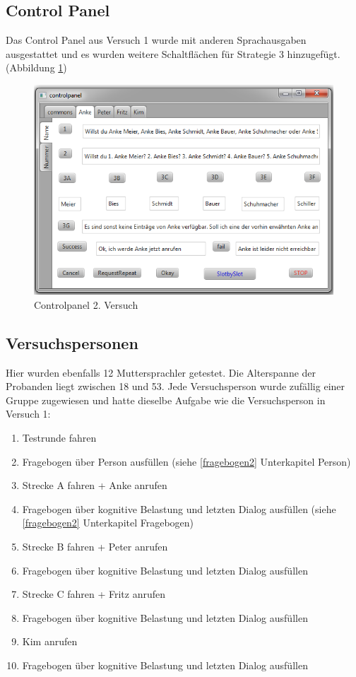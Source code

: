 \documentclass[12pt,a4paper]{scrartcl}
\begin{document}
\subsection{Control Panel}
Das Control Panel aus Versuch 1 wurde mit anderen Sprachausgaben ausgestattet und es wurden weitere Schaltflächen für Strategie 3 hinzugefügt. (Abbildung \ref{cp2})
\begin{figure}[H]
\includegraphics[width=13cm]{controlpanel2.png}
\caption{Controlpanel 2. Versuch}
\label{cp2}
\end{figure}


\subsection{Versuchspersonen}

Hier wurden ebenfalls 12 Muttersprachler getestet. Die Alterspanne der Probanden liegt zwischen 18 und 53. Jede Versuchsperson wurde zufällig einer Gruppe zugewiesen und hatte dieselbe Aufgabe wie die Versuchsperson in Versuch 1: 
\begin{enumerate}
\item Testrunde fahren
\item Fragebogen über Person ausfüllen (siehe \ref{fragebogen2} Unterkapitel Person)
\item Strecke A fahren + Anke anrufen
\item Fragebogen über kognitive Belastung und letzten Dialog ausfüllen (siehe \ref{fragebogen2} Unterkapitel Fragebogen)
\item Strecke B fahren + Peter anrufen
\item Fragebogen über kognitive Belastung und letzten Dialog ausfüllen
\item Strecke C fahren + Fritz anrufen
\item Fragebogen über kognitive Belastung und letzten Dialog ausfüllen 
\item Kim anrufen
\item Fragebogen über kognitive Belastung und letzten Dialog ausfüllen 
\end{enumerate}
\end{document}

